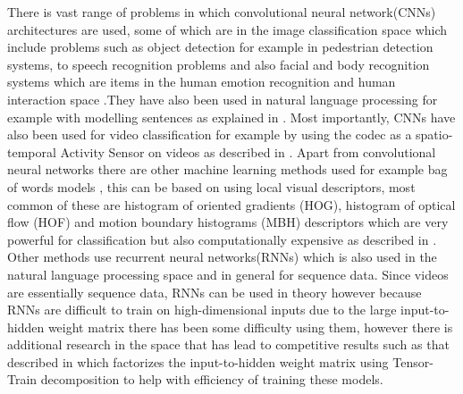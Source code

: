 There is vast range of problems in which convolutional neural network(CNNs) architectures are used, some of which are in the image classification space which include problems such as object detection for example in pedestrian detection \citep{TomeD2016DCNN} systems, to speech  recognition problems and also facial and body recognition systems which are items in the human emotion recognition and human interaction space \cite{knyazev2017convolutional} .They have also been used in natural language processing for example with modelling sentences as explained in \cite{Kalchbrenner_2014}. 
Most importantly, CNNs have also been used for video classification for example by using the codec as a spatio-temporal Activity Sensor on videos as described in \citep{ChadhaA2017VCWC}. Apart from convolutional neural networks there are other machine learning methods used for example bag of words models \citep{10.1007978-3-642-28493-9_34}, this can be based on using local visual descriptors, most common of these are histogram of oriented gradients (HOG), histogram of optical flow (HOF) and motion boundary histograms (MBH) descriptors which are very powerful for classification but also computationally expensive as described in \citep{Uijlings2015}. Other methods use recurrent neural networks(RNNs) which is also used in the natural language processing space and in general for sequence data. Since videos are essentially sequence data, RNNs can be used in theory however because RNNs are difficult to train on high-dimensional inputs due to the large input-to-hidden weight matrix there has been some difficulty using them, however there is additional research in the space that has lead to competitive results such as that described in \citep{yang2017tensortrain} which factorizes the input-to-hidden weight matrix using Tensor-Train decomposition to help with efficiency of training these models.

